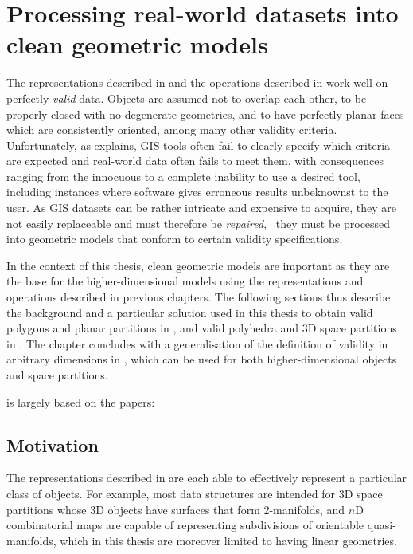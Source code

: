
\chapter{Processing real-world datasets into clean geometric models}
\label{ch:cleaning}

The representations described in  and the operations described in  work well on perfectly \emph{valid} data.
Objects are assumed not to overlap each other, to be properly closed with no degenerate geometries, and to have perfectly planar faces which are consistently oriented, among many other validity criteria.
Unfortunately, as  explains, GIS tools often fail to clearly specify which criteria are expected and real-world data often fails to meet them, with consequences ranging from the innocuous to a complete inability to use a desired tool, including instances where software gives erroneous results unbeknownst to the user.
As GIS datasets can be rather intricate and expensive to acquire, they are not easily replaceable and must therefore be \emph{repaired}, \ie\ they must be processed into geometric models that conform to certain validity specifications.

In the context of this thesis, clean geometric models are important as they are the base for the higher-dimensional models using the representations and operations described in previous chapters.
The following sections thus describe the background and a particular solution used in this thesis to obtain valid polygons and planar partitions in , and valid polyhedra and 3D space partitions in .
The chapter concludes with a generalisation of the definition of validity in arbitrary dimensions in , which can be used for both higher-dimensional objects and space partitions.

 is largely based on the papers:
\begin{itemize}
\paperpfgpprepair%
\papercgeoprepair%
\end{itemize}

\section{Motivation}
\label{se:repair-motivation}

The representations described in  are each able to effectively represent a particular class of objects.
For example, most data structures are intended for 3D space partitions whose 3D objects have surfaces that form 2-manifolds, and $n$D combinatorial maps are capable of representing subdivisions of orientable quasi-manifolds, which in this thesis are moreover limited to having linear geometries.

